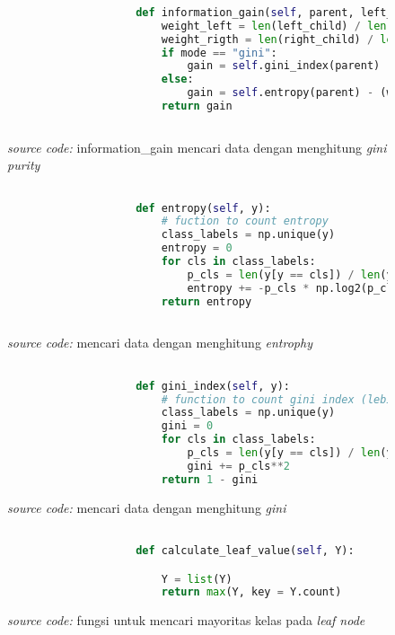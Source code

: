		\begin{figure}[H]
			\begin{lstlisting}[language=Python, basicstyle=\tiny]
					
					def information_gain(self, parent, left_child, right_child, mode="entropy"):
						weight_left = len(left_child) / len(parent)
						weight_rigth = len(right_child) / len(parent)
						if mode == "gini":
							gain = self.gini_index(parent) - (weight_left * self.gini_index(left_child) + weight_rigth * self.gini_index(right_child))
						else:
							gain = self.entropy(parent) - (weight_left * self.entropy(left_child) + weight_rigth * self.entropy(right_child))
						return gain
					
			\end{lstlisting}
			\caption{\emph{source code:} information\_gain mencari data dengan menghitung \emph{gini purity}}
			\label{code: split function}
		\end{figure}
		
		\begin{figure}[H]
			\begin{lstlisting}[language=Python, basicstyle=\tiny]

					def entropy(self, y):
						# fuction to count entropy
						class_labels = np.unique(y)
						entropy = 0
						for cls in class_labels:
							p_cls = len(y[y == cls]) / len(y)
							entropy += -p_cls * np.log2(p_cls)
						return entropy
					
			\end{lstlisting}
			\caption{\emph{source code:} mencari data dengan menghitung \emph{entrophy}}
			\label{code: entrophy calculation function}
		\end{figure}

		\begin{figure}[H]
			\begin{lstlisting}[language=Python, basicstyle=\tiny]

					def gini_index(self, y):
						# function to count gini index (lebih cepet aja karna gak pake log)
						class_labels = np.unique(y)
						gini = 0
						for cls in class_labels:
							p_cls = len(y[y == cls]) / len(y)
							gini += p_cls**2
						return 1 - gini

			\end{lstlisting}
			\caption{\emph{source code:} mencari data dengan menghitung \emph{gini}}
			\label{code: gini calculation function}
		\end{figure}

		\begin{figure}[H]
			\begin{lstlisting}[language=Python, basicstyle=\tiny]

					def calculate_leaf_value(self, Y):

						Y = list(Y)
						return max(Y, key = Y.count)

			\end{lstlisting}
			\caption{\emph{source code:} fungsi untuk mencari mayoritas 
			kelas pada \textit{leaf node}}
			\label{code: find majority class in node function}
		\end{figure} 

